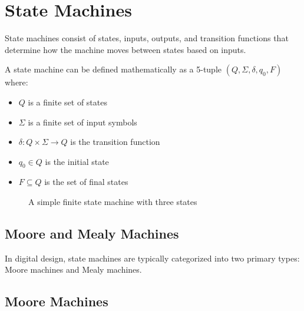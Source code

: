 \section{State Machines}

State machines consist of states, inputs, outputs,
and transition functions that determine how the
machine moves between states based on inputs.

A state machine can be defined mathematically as a 5-tuple $(Q, \Sigma, \delta, q_0, F)$ where:
\begin{itemize}
    \item $Q$ is a finite set of states
    \item $\Sigma$ is a finite set of input symbols
    \item $\delta: Q \times \Sigma \rightarrow Q$ is the transition function
    \item $q_0 \in Q$ is the initial state
    \item $F \subseteq Q$ is the set of final states
\end{itemize}

\begin{figure}[h]
    \centering
    \caption{A simple finite state machine with three states}
    \label{fig:basic_fsm}
\end{figure}

\subsection{Moore and Mealy Machines}

In digital design, state machines are typically categorized into two primary types: Moore machines and Mealy machines.

\subsection*{Moore Machines}

